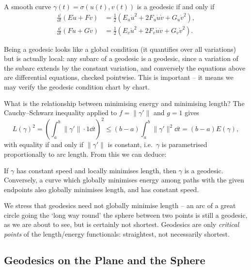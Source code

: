\begin{corollary}
    A smooth curve $\gamma(t) = \sigma(u(t), v(t))$ is a geodesic if and only if
    \begin{align*}
        \frac{\dd}{\dd t}\left(E \dot u + F \dot v\right) &= \frac{1}{2}\left(E_u \dot u^2 + 2F_u \dot u \dot v + G_u \dot v^2\right), \\
        \frac{\dd}{\dd t}\left(F \dot u + G \dot v\right) &= \frac{1}{2}\left(E_v \dot u^2 + 2 F_v \dot u \dot v + G_v \dot v^2\right).
    \end{align*}
\end{corollary}

\begin{remark}
    Being a geodesic looks like a global condition (it quantifies over all variations) but is actually local: any subarc of a geodesic is a geodesic, since a variation of the subarc extends by the constant variation, and conversely the equations above are differential equations, checked pointwise. This is important -- it means we may verify the geodesic condition chart by chart.
\end{remark}

What is the relationship between minimising energy and minimising length? The Cauchy--Schwarz inequality applied to $f = \|\gamma'\|$ and $g = 1$ gives
$$
L(\gamma)^2 = \left(\int_a^b \|\gamma'\| \cdot 1 \dd t\right)^2 \leq (b - a)\int_a^b \|\gamma'\|^2 \dd t = (b - a) E(\gamma),
$$
with equality if and only if $\|\gamma'\|$ is constant, i.e.\ $\gamma$ is parametrised proportionally to arc length. From this we can deduce:

\begin{corollary}
    If $\gamma$ has constant speed and locally minimises length, then $\gamma$ is a geodesic. Conversely, a curve which globally minimises energy among paths with the given endpoints also globally minimises length, and has constant speed.
\end{corollary}

We stress that geodesics need not globally minimise length -- an arc of a great circle going the `long way round' the sphere between two points is still a geodesic, as we are about to see, but is certainly not shortest. Geodesics are only \emph{critical points} of the length/energy functionals: straightest, not necessarily shortest.

\subsection{Geodesics on the Plane and the Sphere}

